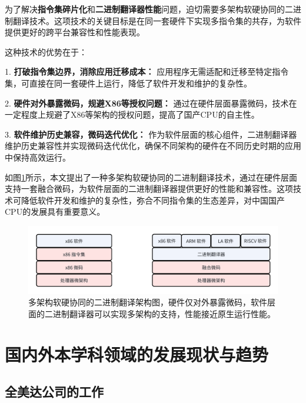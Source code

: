 \documentclass{Style/ucasproposal}%
\begin{document}
为了解决\textbf{指令集碎片化}和\textbf{二进制翻译器性能}问题，迫切需要多架构软硬协同的二进制翻译技术。这项技术的关键目标是在同一套硬件下实现多指令集的共存，为软件提供更好的跨平台兼容性和性能表现。

这种技术的优势在于：

1. \textbf{打破指令集边界，消除应用迁移成本：} 应用程序无需适配和迁移至特定指令集，可直接在同一套硬件上运行，降低了软件开发和维护的复杂性。

2. \textbf{硬件对外暴露微码，规避X86等授权问题：} 通过在硬件层面暴露微码，技术在一定程度上规避了X86等架构的授权问题，提高了国产CPU的自主性。

3. \textbf{软件维护历史兼容，微码迭代优化：} 作为软件层面的核心组件，二进制翻译器维护历史兼容性并实现微码迭代优化，确保不同架构的硬件在不同历史时期的应用中保持高效运行。

如图\ref{img:my_arch}所示，本文提出了一种多架构软硬协同的二进制翻译技术，通过在硬件层面支持一套融合微码，为软件层面的二进制翻译器提供更好的性能和兼容性。这项技术可降低软件开发和维护的复杂性，弥合不同指令集的生态差异，对中国国产CPU的发展具有重要意义。


\begin{figure}[h]
    \centering
    \includegraphics[width=1\linewidth]{./feishuImage/my_arch.png}
    \caption{多架构软硬协同的二进制翻译架构图，硬件仅对外暴露微码，软件层面的二进制翻译器可以实现多架构的支持，性能接近原生运行性能。}
    \label{img:my_arch}
  \end{figure}



\section{国内外本学科领域的发展现状与趋势}

\subsection{全美达公司的工作}
\end{document}
